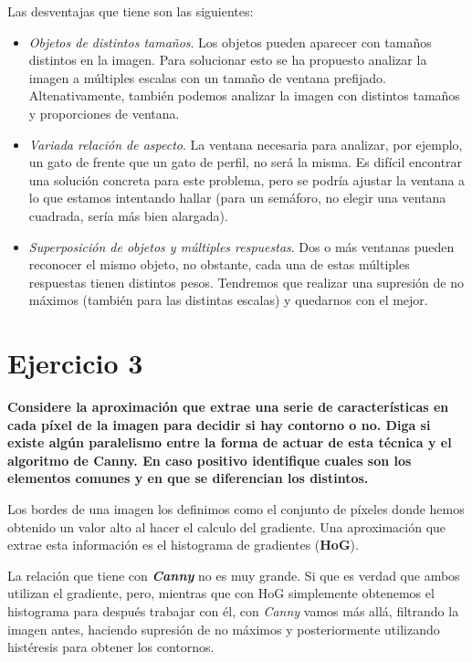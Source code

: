 \documentclass[11pt,a4paper]{article}
\begin{document}
Las desventajas que tiene son las siguientes:
\begin{itemize}
	\item \textit{Objetos de distintos tamaños}. Los objetos pueden aparecer con tamaños distintos en la imagen. Para solucionar esto se ha propuesto analizar
          la imagen a múltiples escalas con un tamaño de ventana prefijado. Altenativamente, también podemos analizar la imagen con distintos tamaños y proporciones
          de ventana.
	\item \textit{Variada relación de aspecto}. La ventana necesaria para analizar, por ejemplo, un gato de frente que un gato de perfil, no será la misma.
		  Es difícil encontrar una solución concreta para este problema, pero se podría ajustar la ventana a lo que estamos intentando hallar (para un semáforo,
          no elegir una ventana cuadrada, sería más bien alargada).
	\item \textit{Superposición de objetos y múltiples respuestas}. Dos o más ventanas pueden reconocer el mismo objeto, no obstante, cada una de estas múltiples
		  respuestas tienen distintos pesos. Tendremos que realizar una supresión de no máximos (también para las distintas escalas) y quedarnos con el mejor.
\end{itemize}


\section*{Ejercicio 3}

\textbf{Considere la aproximación que extrae una serie de características en cada píxel de la imagen para decidir si hay contorno o no. Diga si existe algún
paralelismo entre la forma de actuar de esta técnica y el algoritmo de Canny. En caso positivo identifique cuales son los elementos comunes y en que se
diferencian los distintos.}

Los bordes de una imagen los definimos como el conjunto de píxeles donde hemos obtenido un valor alto al hacer el calculo del gradiente. Una aproximación que
extrae esta información es el histograma de gradientes (\textbf{HoG}).

La relación que tiene con \textbf{\textit{Canny}} no es muy grande. Si que es verdad que ambos utilizan el gradiente, pero, mientras que con HoG simplemente obtenemos
el histograma para después trabajar con él, con \textit{Canny} vamos más allá, filtrando la imagen antes, haciendo supresión de no máximos y posteriormente utilizando
histéresis para obtener los contornos.
\end{document}
